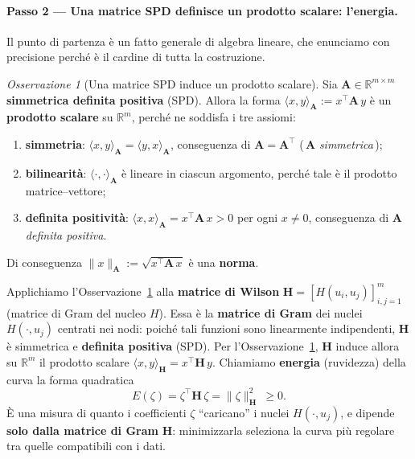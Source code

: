 \documentclass[11pt,a4paper]{article}
\theoremstyle{plain}
\theoremstyle{definition}
\theoremstyle{remark}
\newtheorem*{osservazione}{Osservazione}
\newcommand{\Hmat}{\mathbf{H}}
\newcommand{\transp}{^{\!\top}}
\begin{document}
\paragraph{Passo 2 --- Una matrice SPD definisce un prodotto scalare: l'energia.}
Il punto di partenza \`e un fatto generale di algebra lineare, che enunciamo con
precisione perch\'e \`e il cardine di tutta la costruzione.

\begin{osservazione}[Una matrice SPD induce un prodotto scalare]
\label{oss:spd-prodotto}
Sia $\mathbf{A}\in\mathbb{R}^{m\times m}$ \textbf{simmetrica definita positiva} (SPD).
Allora la forma $\langle x,y\rangle_{\mathbf{A}} := x\transp \mathbf{A}\, y$ \`e un
\textbf{prodotto scalare} su $\mathbb{R}^m$, perch\'e ne soddisfa i tre assiomi:
\begin{enumerate}
  \item \textbf{simmetria}: $\langle x,y\rangle_{\mathbf{A}} = \langle y,x\rangle_{\mathbf{A}}$,
        conseguenza di $\mathbf{A} = \mathbf{A}\transp$ (\,$\mathbf{A}$ \emph{simmetrica}\,);
  \item \textbf{bilinearit\`a}: $\langle \cdot,\cdot\rangle_{\mathbf{A}}$ \`e lineare in
        ciascun argomento, perch\'e tale \`e il prodotto matrice--vettore;
  \item \textbf{definita positivit\`a}: $\langle x,x\rangle_{\mathbf{A}} = x\transp\mathbf{A}\,x > 0$
        per ogni $x\neq 0$, conseguenza di $\mathbf{A}$ \emph{definita positiva}.
\end{enumerate}
Di conseguenza $\|x\|_{\mathbf{A}} := \sqrt{x\transp \mathbf{A}\, x}$ \`e una \textbf{norma}.
\end{osservazione}

Applichiamo l'Osservazione~\ref{oss:spd-prodotto} alla \textbf{matrice di Wilson}
$\Hmat = [H(u_i,u_j)]_{i,j=1}^{m}$ (matrice di Gram del nucleo $H$). Essa \`e la
\textbf{matrice di Gram} dei nuclei $H(\cdot,u_j)$ centrati nei nodi: poich\'e tali funzioni sono linearmente
indipendenti, $\Hmat$ \`e simmetrica e \textbf{definita positiva} (SPD). Per
l'Osservazione~\ref{oss:spd-prodotto}, $\Hmat$ induce allora su $\mathbb{R}^m$ il prodotto
scalare $\langle x,y\rangle_{\Hmat} = x\transp\Hmat\,y$. Chiamiamo \textbf{energia}
(ruvidezza) della curva la forma quadratica
\[
  E(\zeta) = \zeta\transp \Hmat\, \zeta = \|\zeta\|_{\Hmat}^2 \ \ge 0 .
\]
\`E una misura di quanto i coefficienti $\zeta$ ``caricano'' i nuclei $H(\cdot,u_j)$, e dipende
\textbf{solo dalla matrice di Gram} $\Hmat$: minimizzarla seleziona la curva pi\`u regolare
tra quelle compatibili con i dati.
\end{document}
